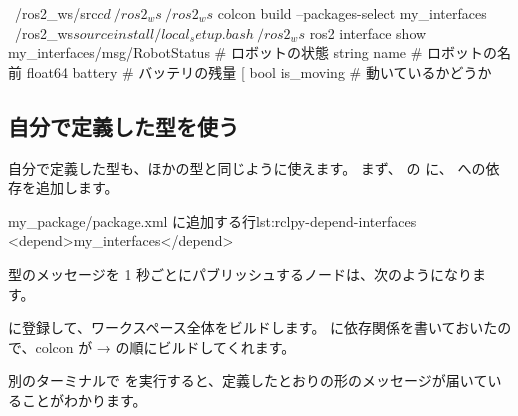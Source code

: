 \begin{terminal}[インタフェースのパッケージをビルドする]
~/ros2_ws/src$ cd ~/ros2_ws
~/ros2_ws$ colcon build --packages-select my_interfaces
~/ros2_ws$ source install/local_setup.bash
~/ros2_ws$ ros2 interface show my_interfaces/msg/RobotStatus
# ロボットの状態
string name       # ロボットの名前
float64 battery   # バッテリの残量 [%
bool is_moving    # 動いているかどうか
\end{terminal}

\subsection{自分で定義した型を使う}

自分で定義した型も、ほかの型と同じように使えます。
まず、 の  に、 への依存を追加します。

\begin{codelisting}[style=xml, numbers=none, xleftmargin=0pt, framexleftmargin=0pt]{my\_package/package.xml に追加する行}{lst:rclpy-depend-interfaces}
  <depend>my_interfaces</depend>
\end{codelisting}

 型のメッセージを 1 秒ごとにパブリッシュするノードは、次のようになります。


 に登録して、ワークスペース全体をビルドします。
 に依存関係を書いておいたので、colcon が  →  の順にビルドしてくれます。


別のターミナルで  を実行すると、定義したとおりの形のメッセージが届いていることがわかります。

